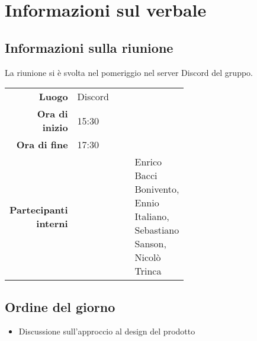 \section{Informazioni sul verbale}

\subsection{Informazioni sulla riunione}
La riunione si è svolta nel pomeriggio nel server Discord del gruppo.

\begin{center}
	\begin{tabular}{r|p{0.6\linewidth}}
		\toprule
		\textbf{Luogo} & Discord \\
		\textbf{Ora di inizio} & 15:30 \\
		\textbf{Ora di fine} & 17:30 \\
		\textbf{Partecipanti interni} & & Enrico Bacci Bonivento, Ennio Italiano, Sebastiano Sanson, Nicolò Trinca
	\end{tabular}
\end{center}

\medskip

\subsection{Ordine del giorno}
\begin{itemize}
	\item Discussione sull'approccio al design del prodotto
\end{itemize}